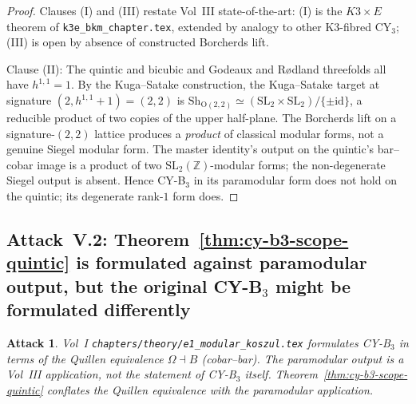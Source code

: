 \documentclass[11pt]{amsart}
\newtheorem{attack}[theorem]{Attack}
\providecommand{\Z}{\mathbb{Z}}
\providecommand{\SL}{\mathrm{SL}}
\begin{document}
\begin{proof}
Clauses (I) and (III) restate Vol~III state-of-the-art: (I) is the
$K3 \times E$ theorem of \texttt{k3e\_bkm\_chapter.tex}, extended by
analogy to other K3-fibred CY$_3$; (III) is open by absence of
constructed Borcherds lift.

Clause (II): The quintic and bicubic and Godeaux and R{\o}dland
threefolds all have $h^{1,1} = 1$. By the Kuga--Satake construction,
the Kuga--Satake target at signature $(2, h^{1,1} + 1) = (2, 2)$
is $\mathrm{Sh}_{\mathrm{O}(2, 2)} \simeq (\SL_2 \times \SL_2)/
\{\pm \mathrm{id}\}$, a reducible product of two copies of the
upper half-plane. The Borcherds lift on a signature-$(2, 2)$
lattice produces a \emph{product} of classical modular forms, not a
genuine Siegel modular form. The master identity's output on the
quintic's bar--cobar image is a product of two
$\SL_2(\Z)$-modular forms; the non-degenerate Siegel output is
absent. Hence CY-B$_3$ in its paramodular form does not hold on the
quintic; its degenerate rank-$1$ form does.
\end{proof}

\subsection{Attack~V.2: Theorem~\ref{thm:cy-b3-scope-quintic} is
formulated against paramodular output, but the original CY-B$_3$
might be formulated differently}

\begin{attack}
\label{att:cy-b3-original-formulation}
Vol~I \texttt{chapters/theory/e1\_modular\_koszul.tex} formulates
CY-B$_3$ in terms of the Quillen equivalence
$\Omega \dashv B$ (cobar--bar). The paramodular output is a
Vol~III \emph{application}, not the statement of CY-B$_3$ itself.
Theorem~\ref{thm:cy-b3-scope-quintic} conflates the Quillen
equivalence with the paramodular application.
\end{attack}
\end{document}
